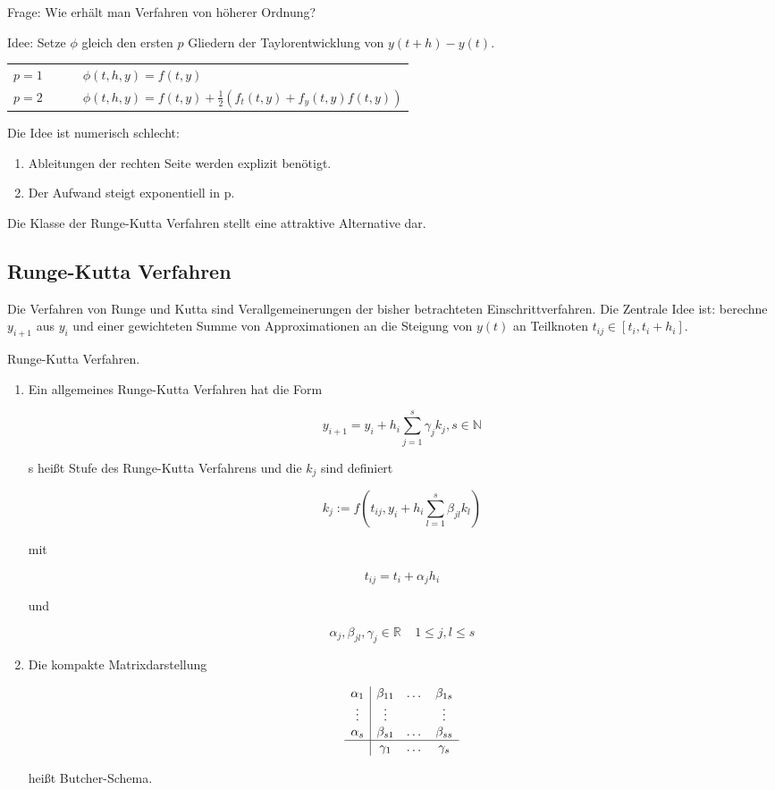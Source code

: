 Frage: Wie erhält man Verfahren von höherer Ordnung?

Idee: Setze $\phi$ gleich den ersten $p$ Gliedern der Taylorentwicklung von $y(t + h) - y(t)$.

\begin{tabular}{ l l }
	$p=1 \;\;\;\;\;\;\;\;$ & $\phi(t,h,y) = f(t,y)$\\
	$p=2 \;\;\;\;\;\;\;\;$ & $\phi(t,h,y) = f(t,y) + \frac{1}{2} (f_t(t,y) + f_y(t,y) f(t,y))$
\end{tabular}

Die Idee ist numerisch schlecht:

\begin{enumerate}
	\item Ableitungen der rechten Seite werden explizit benötigt.
	\item Der Aufwand steigt exponentiell in p.
\end{enumerate}

Die Klasse der Runge-Kutta Verfahren stellt eine attraktive Alternative dar.

\subsection{Runge-Kutta Verfahren}

Die Verfahren von Runge und Kutta sind Verallgemeinerungen der bisher betrachteten Einschrittverfahren. Die Zentrale Idee ist: berechne $y_{i+1}$ aus $y_i$ und einer gewichteten Summe von Approximationen an die Steigung von $y(t)$ an Teilknoten $t_{ij} \in [t_i, t_i + h_i]$.

\begin{definition}[Definition IV.6] Runge-Kutta Verfahren.
	\begin{enumerate}
		\item Ein allgemeines Runge-Kutta Verfahren hat die Form
		
		$$y_{i+1} = y_i + h_i \sum_{j=1}^s \gamma_j k_j, s \in \mathbb{N}$$
		
		s heißt Stufe des Runge-Kutta Verfahrens und die $k_j$ sind definiert
		
		$$k_j := f(t_{ij}, y_i + h_i \sum_{l=1}^s \beta_{jl} k_l)$$
		
		mit
		
		$$t_{ij} = t_i + \alpha_j h_i$$
		
		und
		
		$$\alpha_j, \beta_{jl}, \gamma_j \in \mathbb{R} \;\;\;\; 1 \le j, l \le s$$ 
		
		\item Die kompakte Matrixdarstellung 
		
		$$\begin{array}{c|ccc}
			\alpha_1 & \beta_{11} & \dots & \beta_{1s} \\
			\vdots   & \vdots     &       & \vdots \\
			\alpha_s & \beta_{s1} & \dots & \beta_{ss} \\
			\hline
			         & \gamma_{1} & \dots & \gamma_{s} 
		\end{array}$$
		
		heißt Butcher-Schema.
	\end{enumerate}
\end{definition}

